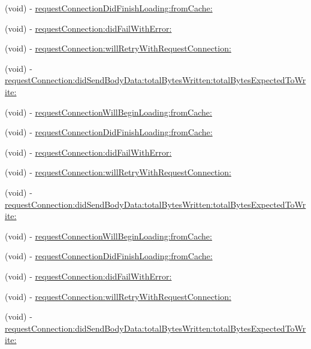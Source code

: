 \begin{DoxyCompactItemize}
(void) -\/ \hyperlink{protocolFBRequestConnectionDelegate_01-p_ade2925bfe662c883d45fe849f332991f}{request\+Connection\+Did\+Finish\+Loading\+:from\+Cache\+:}
\item 
(void) -\/ \hyperlink{protocolFBRequestConnectionDelegate_01-p_a2625e8e847596ba8b2baf3a30fe24268}{request\+Connection\+:did\+Fail\+With\+Error\+:}
\item 
(void) -\/ \hyperlink{protocolFBRequestConnectionDelegate_01-p_aa3a69b65c59523a708b4f343730d7966}{request\+Connection\+:will\+Retry\+With\+Request\+Connection\+:}
\item 
(void) -\/ \hyperlink{protocolFBRequestConnectionDelegate_01-p_a84427a6debebcef494f5766d8f70ce16}{request\+Connection\+:did\+Send\+Body\+Data\+:total\+Bytes\+Written\+:total\+Bytes\+Expected\+To\+Write\+:}
\item 
(void) -\/ \hyperlink{protocolFBRequestConnectionDelegate_01-p_a8e31e2b5023edb3b869c0cd0be288a29}{request\+Connection\+Will\+Begin\+Loading\+:from\+Cache\+:}
\item 
(void) -\/ \hyperlink{protocolFBRequestConnectionDelegate_01-p_ade2925bfe662c883d45fe849f332991f}{request\+Connection\+Did\+Finish\+Loading\+:from\+Cache\+:}
\item 
(void) -\/ \hyperlink{protocolFBRequestConnectionDelegate_01-p_a2625e8e847596ba8b2baf3a30fe24268}{request\+Connection\+:did\+Fail\+With\+Error\+:}
\item 
(void) -\/ \hyperlink{protocolFBRequestConnectionDelegate_01-p_aa3a69b65c59523a708b4f343730d7966}{request\+Connection\+:will\+Retry\+With\+Request\+Connection\+:}
\item 
(void) -\/ \hyperlink{protocolFBRequestConnectionDelegate_01-p_a84427a6debebcef494f5766d8f70ce16}{request\+Connection\+:did\+Send\+Body\+Data\+:total\+Bytes\+Written\+:total\+Bytes\+Expected\+To\+Write\+:}
\item 
(void) -\/ \hyperlink{protocolFBRequestConnectionDelegate_01-p_a8e31e2b5023edb3b869c0cd0be288a29}{request\+Connection\+Will\+Begin\+Loading\+:from\+Cache\+:}
\item 
(void) -\/ \hyperlink{protocolFBRequestConnectionDelegate_01-p_ade2925bfe662c883d45fe849f332991f}{request\+Connection\+Did\+Finish\+Loading\+:from\+Cache\+:}
\item 
(void) -\/ \hyperlink{protocolFBRequestConnectionDelegate_01-p_a2625e8e847596ba8b2baf3a30fe24268}{request\+Connection\+:did\+Fail\+With\+Error\+:}
\item 
(void) -\/ \hyperlink{protocolFBRequestConnectionDelegate_01-p_aa3a69b65c59523a708b4f343730d7966}{request\+Connection\+:will\+Retry\+With\+Request\+Connection\+:}
\item 
(void) -\/ \hyperlink{protocolFBRequestConnectionDelegate_01-p_a84427a6debebcef494f5766d8f70ce16}{request\+Connection\+:did\+Send\+Body\+Data\+:total\+Bytes\+Written\+:total\+Bytes\+Expected\+To\+Write\+:}
\end{DoxyCompactItemize}


